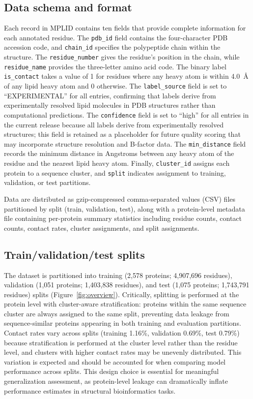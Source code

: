 \documentclass[unnumsec,webpdf,contemporary,large]{oup-authoring-template}
\begin{document}
\subsection{Data schema and format}

Each record in MPLID contains ten fields that provide complete information for each annotated residue. The \texttt{pdb\_id} field contains the four-character PDB accession code, and \texttt{chain\_id} specifies the polypeptide chain within the structure. The \texttt{residue\_number} gives the residue's position in the chain, while \texttt{residue\_name} provides the three-letter amino acid code. The binary label \texttt{is\_contact} takes a value of 1 for residues where any heavy atom is within 4.0~\AA{} of any lipid heavy atom and 0 otherwise. The \texttt{label\_source} field is set to ``EXPERIMENTAL'' for all entries, confirming that labels derive from experimentally resolved lipid molecules in PDB structures rather than computational predictions. The \texttt{confidence} field is set to ``high'' for all entries in the current release because all labels derive from experimentally resolved structures; this field is retained as a placeholder for future quality scoring that may incorporate structure resolution and B-factor data. The \texttt{min\_distance} field records the minimum distance in Angstroms between any heavy atom of the residue and the nearest lipid heavy atom. Finally, \texttt{cluster\_id} assigns each protein to a sequence cluster, and \texttt{split} indicates assignment to training, validation, or test partitions.

Data are distributed as gzip-compressed comma-separated values (CSV) files partitioned by split (train, validation, test), along with a protein-level metadata file containing per-protein summary statistics including residue counts, contact counts, contact rates, cluster assignments, and split assignments.

\subsection{Train/validation/test splits}

The dataset is partitioned into training (2,578 proteins; 4,907,696 residues), validation (1,051 proteins; 1,403,838 residues), and test (1,075 proteins; 1,743,791 residues) splits (Figure~\ref{fig:overview}). Critically, splitting is performed at the protein level with cluster-aware stratification: proteins within the same sequence cluster are always assigned to the same split, preventing data leakage from sequence-similar proteins appearing in both training and evaluation partitions. Contact rates vary across splits (training 1.16\%, validation 0.69\%, test 0.79\%) because stratification is performed at the cluster level rather than the residue level, and clusters with higher contact rates may be unevenly distributed. This variation is expected and should be accounted for when comparing model performance across splits. This design choice is essential for meaningful generalization assessment, as protein-level leakage can dramatically inflate performance estimates in structural bioinformatics tasks.
\end{document}
